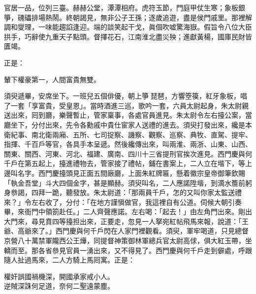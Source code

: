 \begin{myquote}
官居一品，位列三臺。赫赫公堂，潭潭相府。虎符玉節，門庭甲仗生寒；象板銀箏，磈礧排場熱鬧。終朝謁見，無非公子王孫；逐歲追遊，盡是侯門戚里。那裡解調和燮理，一味能趨諂逢迎。端的談笑起干戈，眞個吹嘘驚海嶽。假旨令八位大臣拱手，巧辭使九重天子點頭。督擇花石，江南淮北盡災殃；進獻黃楊，國庫民財皆匱竭。
\end{myquote}

正是：

\begin{myquote}
輦下權豪第一，人間富貴無雙。
\end{myquote}

須臾遞畢，安席坐下。一班兒五個俳優，朝上箏𥱧琵琶，方響箜篌，紅牙象板，唱了一套「享富貴，受皇恩」。當時酒進三巡，歌吟一套，六員太尉起身，朱太尉親送出來，囘到廳，樂聲暫止，管家稟事，各處官員進見。朱太尉令左右擡公案，當廳坐下，分付出來，先令各勳戚中貴仕宦家人送禮的進去。須臾打發出來，纔是本衛紀事、南北衛兩廂、五所、七司捉察、譏察、觀察、巡察、典牧、直駕、提牢、指揮、千百戶等官，各具手本呈遞。然後纔傳出來，叫兩淮、兩浙、山東、山西、關東、關西、河東、河北、福建、廣南、四川十三省提刑官挨次進見。西門慶與何千戶在第五起上，擡進禮物去，管家接了禮帖，鋪在書案上，二人立在堦下，等上邊叫名字。西門慶擡頭見正面五間廠廳，上面朱紅牌匾，懸着徽宗皇帝御筆欽賜「執金吾堂」斗大四個金字，甚是顯赫。須臾叫名，二人應諾陞堦，到滴水簷前躬身叅謁，四拜一跪，聽發放。朱太尉道：「那兩員千戶，怎的又叫你家太監送禮來？」令左右收了，分付：「在地方謹愼做官，我這裡自有公道。伺候大朝引奏畢，來衙門中領箚赴任。」二人齊聲應諾。左右喝：「起去！」由左角門出來。剛出大門來，尋見賁四等擡担出來，正要走，忽見一人拏宛紅帖飛馬來報，說道：「王爺、高爺來了。」西門慶與何千戶閃在人家門裡觀看。須臾，軍牢喝道，只見總督京營八十萬禁軍隴西公王燁，同提督神策御林軍總兵官太尉高俅，俱大紅玉帶，坐轎而至。那各省叅見官員一湧出來，又不得見了。西門慶與何千戶走到僻處，呼跟隨人扯過馬來，二人方騎上馬囘寓。正是：

\begin{myquote}
權奸誤國禍機深，開國承家戒小人。\\逆賊深誅何足道，奈何二聖遠蒙塵。
\end{myquote}

